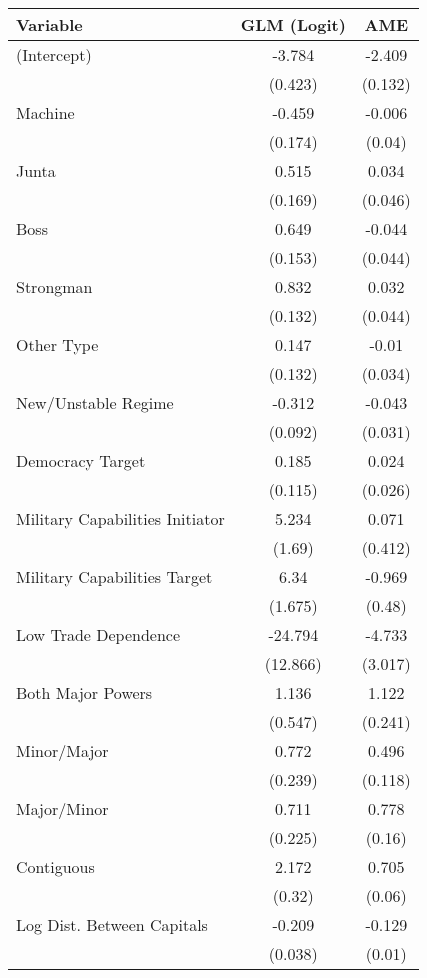 \begin{table}[ht]
\centering
\begingroup\scriptsize
\begin{tabular}{lcc}
 Variable & GLM (Logit) & AME \\ 
  \hline
\hline
(Intercept) & -3.784 & -2.409 \\ 
   & (0.423) & (0.132) \\ 
  Machine & -0.459 & -0.006 \\ 
   & (0.174) & (0.04) \\ 
  Junta & 0.515 & 0.034 \\ 
   & (0.169) & (0.046) \\ 
  Boss & 0.649 & -0.044 \\ 
   & (0.153) & (0.044) \\ 
  Strongman & 0.832 & 0.032 \\ 
   & (0.132) & (0.044) \\ 
  Other Type & 0.147 & -0.01 \\ 
   & (0.132) & (0.034) \\ 
  New/Unstable Regime & -0.312 & -0.043 \\ 
   & (0.092) & (0.031) \\ 
  Democracy Target & 0.185 & 0.024 \\ 
   & (0.115) & (0.026) \\ 
  Military Capabilities Initiator & 5.234 & 0.071 \\ 
   & (1.69) & (0.412) \\ 
  Military Capabilities Target  & 6.34 & -0.969 \\ 
   & (1.675) & (0.48) \\ 
  Low Trade Dependence  & -24.794 & -4.733 \\ 
   & (12.866) & (3.017) \\ 
  Both Major Powers & 1.136 & 1.122 \\ 
   & (0.547) & (0.241) \\ 
  Minor/Major & 0.772 & 0.496 \\ 
   & (0.239) & (0.118) \\ 
  Major/Minor & 0.711 & 0.778 \\ 
   & (0.225) & (0.16) \\ 
  Contiguous & 2.172 & 0.705 \\ 
   & (0.32) & (0.06) \\ 
  Log Dist. Between Capitals & -0.209 & -0.129 \\ 
   & (0.038) & (0.01) \\ 

\end{tabular}
\end{table}

